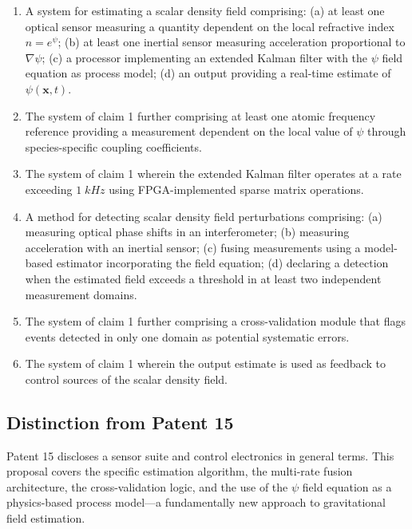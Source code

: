 \documentclass[11pt,a4paper]{article}
\begin{document}
\begin{enumerate}
\item A system for estimating a scalar density field comprising:
(a) at least one optical sensor measuring a quantity dependent
on the local refractive index $n = e^\psi$; (b) at least one
inertial sensor measuring acceleration proportional to
$\nabla\psi$; (c) a processor implementing an extended Kalman
filter with the $\psi$ field equation as process model; (d) an
output providing a real-time estimate of $\psi(\mathbf{x},t)$.

\item The system of claim 1 further comprising at least one
atomic frequency reference providing a measurement dependent
on the local value of $\psi$ through species-specific coupling
coefficients.

\item The system of claim 1 wherein the extended Kalman filter
operates at a rate exceeding $1\;\si{kHz}$ using FPGA-implemented
sparse matrix operations.

\item A method for detecting scalar density field perturbations
comprising: (a) measuring optical phase shifts in an
interferometer; (b) measuring acceleration with an inertial
sensor; (c) fusing measurements using a model-based estimator
incorporating the field equation; (d) declaring a detection
when the estimated field exceeds a threshold in at least two
independent measurement domains.

\item The system of claim 1 further comprising a cross-validation
module that flags events detected in only one domain as
potential systematic errors.

\item The system of claim 1 wherein the output estimate is
used as feedback to control sources of the scalar density field.
\end{enumerate}

\subsection{Distinction from Patent 15}

Patent 15 discloses a sensor suite and control electronics in
general terms.  This proposal covers the specific estimation
algorithm, the multi-rate fusion architecture, the cross-validation
logic, and the use of the $\psi$ field equation as a physics-based
process model---a fundamentally new approach to gravitational
field estimation.
\end{document}
